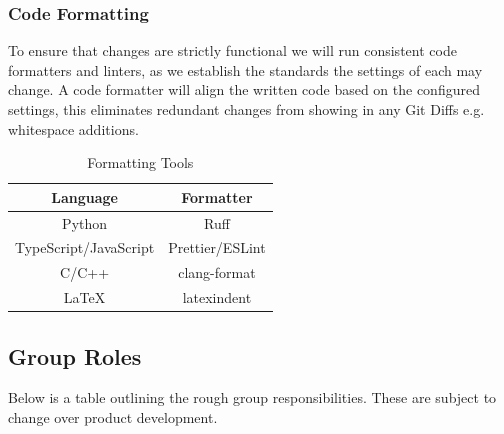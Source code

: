 \documentclass[a4]{article}
\begin{document}
\subsubsection{Code Formatting}

To ensure that changes are strictly functional we will run consistent code formatters and linters,
as we establish the standards the settings of each may change. A code formatter will align the written code
based on the configured settings, this eliminates redundant changes from showing in any Git Diffs e.g. whitespace additions.

\begin{table}[h!]
	\centering
	\begin{tabular}{|c|c|}
		\hline
		\textcolor{McMasterMaroon}{\textbf{Language}} &
		\textcolor{McMasterMaroon}{\textbf{Formatter}}                  \\
		\hline
		Python                                        & Ruff            \\
		\hline
		TypeScript/JavaScript                         & Prettier/ESLint \\
		\hline
		C/C++                                         & clang-format    \\
		\hline
		LaTeX                                         & latexindent     \\
		\hline
	\end{tabular}
	\caption{Formatting Tools}
\end{table}






\clearpage
\subsection{Group Roles}

Below is a table outlining the rough group responsibilities. These are subject to change over product development.
\end{document}
